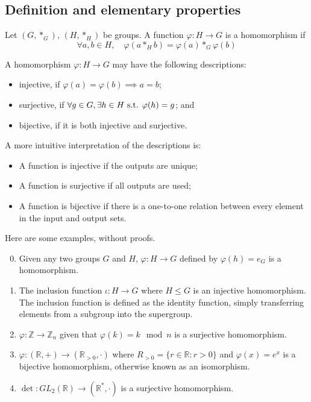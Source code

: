 \subsection{Definition and elementary properties}
\begin{definition}
	Let \((G, \ast_G)\), \((H, \ast_H)\) be groups.
	A function \(\varphi: H \to G\) is a homomorphism if
	\[
		\forall a, b \in H,\quad \varphi(a \ast_H b) = \varphi(a) \ast_G \varphi(b)
	\]
\end{definition}
A homomorphism \(\varphi: H \to G\) may have the following descriptions:
\begin{itemize}
	\item injective, if \(\varphi(a) = \varphi(b) \implies a = b\);
	\item surjective, if \(\forall g \in G, \exists h \in H \text{ s.t. } \varphi(h) = g\); and
	\item bijective, if it is both injective and surjective.
\end{itemize}
A more intuitive interpretation of the descriptions is:
\begin{itemize}
	\item A function is injective if the outputs are unique;
	\item A function is surjective if all outputs are used;
	\item A function is bijective if there is a one-to-one relation between every element in the input and output sets.
\end{itemize}
Here are some examples, without proofs.
\begin{enumerate}
	\setcounter{enumi}{-1}
	\item Given any two groups \(G\) and \(H\), \(\varphi: H \to G\) defined by \(\varphi(h) = e_G\) is a homomorphism.
	\item The inclusion function \(\iota: H \to G\) where \(H \leq G\) is an injective homomorphism.
	      The inclusion function is defined as the identity function, simply transferring elements from a subgroup into the supergroup.
	\item \(\varphi: \mathbb Z \to \mathbb Z_n\) given that \(\varphi(k) = k \mod n\) is a surjective homomorphism.
	\item \(\varphi: (\mathbb R, +) \to (\mathbb R_{>0}, \cdot)\) where \(R_{>0} = \{r \in \mathbb R : r > 0\}\) and \(\varphi(x) = e^x\) is a bijective homomorphism, otherwise known as an isomorphism.
	\item \(\det : GL_2(\mathbb R) \to (\mathbb R^*, \cdot)\) is a surjective homomorphism.
\end{enumerate}

